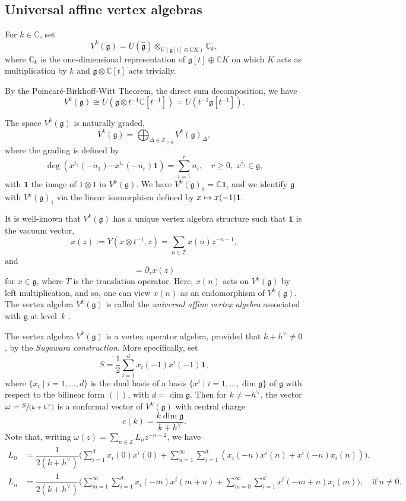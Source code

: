 \documentclass[11pt]{article}
\numberwithin{equation}{section}
\let\oldvee\vee
\renewcommand{\vee}{{\scriptscriptstyle\oldvee}}
\newcommand\mto{\mathchoice{\longmapsto}{\mapsto}{\mapsto}{\mapsto}}
\newcommand{\spfrac}[2]{\sfrac{#1}{(#2)}}
\newcommand\C{{\mathbb C}}
\newcommand\Z{{\mathbb Z}}
\newcommand \g{\mathfrak g}
\newcommand \frg{\widehat{\mathfrak{g}}}
\theoremstyle{definition}
\begin{document}
\subsection{Universal affine vertex algebras}
\label{sec:Universal affine vertex algebras}
For $k \in \C$, set
\begin{equation*}
V^k(\g)=U(\frg)\otimes _{U(\g [t]\oplus \C K)}\C_k,
\end{equation*}
where $\C_k$ is the one-dimensional representation of $\g [t]\oplus \C K$
on which $K$ acts as multiplication by $k$ and $\g\otimes \C[t]$ acts trivially.

By the Poincaré-Birkhoff-Witt Theorem, the direct sum decomposition,
we have
\begin{equation}
V^k(\g)\cong U(\g \otimes t^{-1}\C[t^{-1}]) = U(t^{-1} \g[t^{-1}]).
\label{eq:PBW}
\end{equation}

The space $V^k(\g)$ is naturally graded,
\begin{equation*}
V^k(\g) =\bigoplus_{\Delta\in \Z_{\geq 0}}V^k(\g) _{\Delta},
\end{equation*}
where the grading is defined by
\[
\deg (x^{i_1}(-n_1)\cdots x^{i_r}(-n_r) \mathbf{1}) = \sum_{i=1}^r n_i,
\quad r \geq 0, \; x^{i_j} \in \g,
\]
with $\mathbf{1}$ the image of $1\otimes 1$ in $V^k(\g)$.
We have $V^k(\g)_0=\C\mathbf{1} $,
and we identify $\g$ with $V^k(\g)_1$ via the linear isomorphism
defined by $x\mto x(-1)\mathbf{1} $.

It is well-known that $V^k(\g)$ has a unique vertex algebra structure
such that $\mathbf{1}$ is the vacuum vector,
\[
x(z) := Y(x\otimes t^{-1},z) =\sum_{n \in \Z} x(n) z^{-n-1},
\]
and
\begin{equation*}
[T,x(z)]=\partial_z x(z)
\end{equation*}
for $x \in \g$,
where $T$ is the translation operator.
Here, $x(n)$ acts on $V^k(\g)$ by left multiplication, and
so, one can view $x(n)$ as an endomorphism of $V^k(\g)$.
The vertex algebra
$V^k(\g)$ is called the \emph{universal affine vertex algebra}
associated with $\g$ at level~$k$ \cite{FZ,Zhu96,LL}.

The vertex algebra
$V^k(\g)$ is a vertex operator algebra, provided that $k+h^\vee\not=0$,
by the \emph{Sugawara construction}.
More specifically, set
\[
S=\displaystyle{\frac{1}{2}} \sum_{i=1}^{d}
x_{i}(-1) x^{i}(-1) \mathbf{1},
\]
where $\{x_{i}\mid i=1,\dots,d\}$ is the dual
basis of a basis $\{x^{i}\mid i=1,\dots,\dim \g\}$ of $\g$
with respect to the bilinear form $(~|~)$, with $d = \dim \g$.
Then for $k \not=-h^\vee$, the vector
$\omega=\displaystyle{\spfrac{S}{k+h^\vee}}$
is a conformal vector of $V^k(\g)$ with central charge
\[
c(k)=\displaystyle{\frac{k \dim \g}{k+h^\vee}}.
\]
Note that, writing $\omega(z) = \sum_{n \in \Z} L_n z^{-n-2}$,
we have
\begin{align*}
L_0&= \dfrac{1}{2(k+h^\vee)}
\biggl(\sum_{i=1}^{d}x_i(0)x^i(0)+\sum_{n=1}^{\infty}\sum_{i=1}^{d}(x_i(-n)x^i(n)+x^i(-n)x_i(n)) \biggr),\\
L_n&=\dfrac{1}{2(k+h^\vee)}
\biggl(\sum_{m=1}^{\infty}\sum_{i=1}^{d}x_i(-m)x^i(m+n)
+\sum_{m=0}^{\infty}\sum_{i=1}^{d}x^i(-m+n)x_i(m)\biggr), \quad
\text{if} \ n\!\neq\! 0.
\end{align*}
\end{document}
